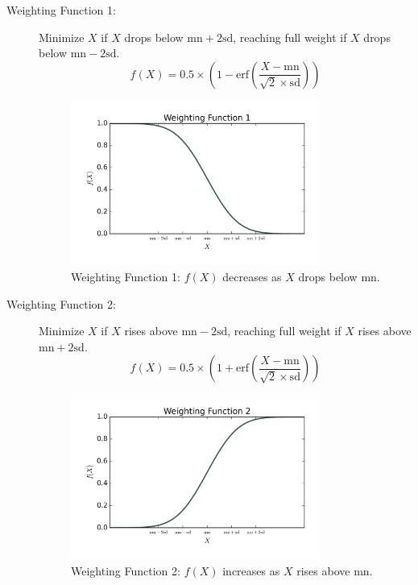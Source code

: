 \documentclass[a4paper,12pt]{article}
\begin{document}
\begin{description}
    \item[Weighting Function 1:] Minimize \(X\) if \(X\) drops below \(\text{mn} +
          2\text{sd}\), reaching full weight if \(X\) drops below \(\text{mn} -
          2\text{sd}\).
          \begin{equation}
              f(X) = 0.5 \times \left(1 - \text{erf}\left(\frac{X - \text{mn}}{\sqrt{2} \times \text{sd}}\right)\right)
          \end{equation}
          \begin{figure}[H]
              \centering
              \includegraphics[width=0.8\textwidth]{figures/weighting_function_1.png}
              \caption{Weighting Function 1: \(f(X)\) decreases as \(X\) drops below \(\text{mn}\).}
          \end{figure}

    \item[Weighting Function 2:] Minimize \(X\) if \(X\) rises above \(\text{mn} -
          2\text{sd}\), reaching full weight if \(X\) rises above \(\text{mn} +
          2\text{sd}\).
          \begin{equation}
              f(X) = 0.5 \times \left(1 + \text{erf}\left(\frac{X - \text{mn}}{\sqrt{2} \times \text{sd}}\right)\right)
          \end{equation}
          \begin{figure}[H]
              \centering
              \includegraphics[width=0.8\textwidth]{figures/weighting_function_2.png}
              \caption{Weighting Function 2: \(f(X)\) increases as \(X\) rises above \(\text{mn}\).}
          \end{figure}


\end{description}
\end{document}
